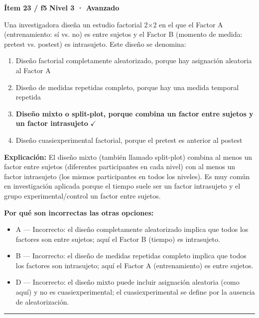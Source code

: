 \documentclass[12pt,a4paper]{article}
\begin{document}
\begin{mdframed}[backgroundcolor=fondogris,linecolor=rojo,linewidth=1pt,innerleftmargin=10pt,innerrightmargin=10pt,innertopmargin=7pt,innerbottommargin=7pt]
\textbf{Ítem 23 / f5} \hfill {\small\bfseries\color{rojo} Nivel 3 · Avanzado}
\end{mdframed}

Una investigadora diseña un estudio factorial 2×2 en el que el Factor A (entrenamiento: sí vs. no) es entre sujetos y el Factor B (momento de medida: pretest vs. postest) es intrasujeto. Este diseño se denomina:

\begin{enumerate}
  \item[A.] Diseño factorial completamente aleatorizado, porque hay asignación aleatoria al Factor A
  \item[B.] Diseño de medidas repetidas completo, porque hay una medida temporal repetida
  \item[\textbf{\color{verde}C.}] \textbf{\color{verde} Diseño mixto o split-plot, porque combina un factor entre sujetos y un factor intrasujeto} \hfill $\checkmark$
  \item[D.] Diseño cuasiexperimental factorial, porque el pretest es anterior al postest
\end{enumerate}

\noindent\textbf{\color{azul}Explicación:} El diseño mixto (también llamado split-plot) combina al menos un factor entre sujetos (diferentes participantes en cada nivel) con al menos un factor intrasujeto (los mismos participantes en todos los niveles). Es muy común en investigación aplicada porque el tiempo suele ser un factor intrasujeto y el grupo experimental/control un factor entre sujetos.

\noindent\textbf{\color{gris}Por qué son incorrectas las otras opciones:}
\begin{itemize}
  \item {\small A — Incorrecto: el diseño completamente aleatorizado implica que todos los factores son entre sujetos; aquí el Factor B (tiempo) es intrasujeto.}
  \item {\small B — Incorrecto: el diseño de medidas repetidas completo implica que todos los factores son intrasujeto; aquí el Factor A (entrenamiento) es entre sujetos.}
  \item {\small D — Incorrecto: el diseño mixto puede incluir asignación aleatoria (como aquí) y no es cuasiexperimental; el cuasiexperimental se define por la ausencia de aleatorización.}
\end{itemize}
\vspace{8pt}\hrule\vspace{10pt}
\end{document}
